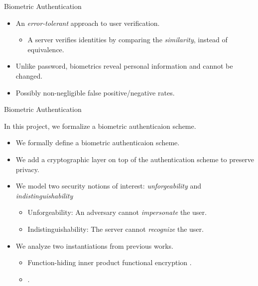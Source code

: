 \begin{frame}{Biometric Authentication}

\begin{itemize}
	\item An \emph{error-tolerant} approach to user verification.
	\begin{itemize}
		\item A server verifies identities by comparing the \emph{similarity}, instead of equivalence.
	\end{itemize}
	\pause

	\item Unlike password, biometrics reveal personal information and cannot be changed.
	\pause

	\item Possibly non-negligible false positive/negative rates.
\end{itemize}

\end{frame}


\begin{frame}{Biometric Authentication}

In this project, we formalize a biometric authenticaion scheme.
\pause

\begin{itemize}

	\item<2-> We formally define a biometric authenticaion scheme.

	\item<3-> We add a cryptographic layer on top of the authentication scheme to preserve privacy.

	\item<4-> We model two security notions of interest: \emph{unforgeability} and \emph{indistinguishability}
	\begin{itemize}
		\item<5-> Unforgeability: An adversary cannot \emph{impersonate} the user.
		\item<6-> Indistinguishability: The server cannot \emph{recognize} the user.
	\end{itemize}

	\item<7-> We analyze two instantiations from previous works.
	\begin{itemize}
		\item<8-> Function-hiding inner product functional encryption \cite{cryptoeprint:2023/481}.
		\item<9-> {} \cite{cryptoeprint:2014/394}.
	\end{itemize}

\end{itemize}


\end{frame}


